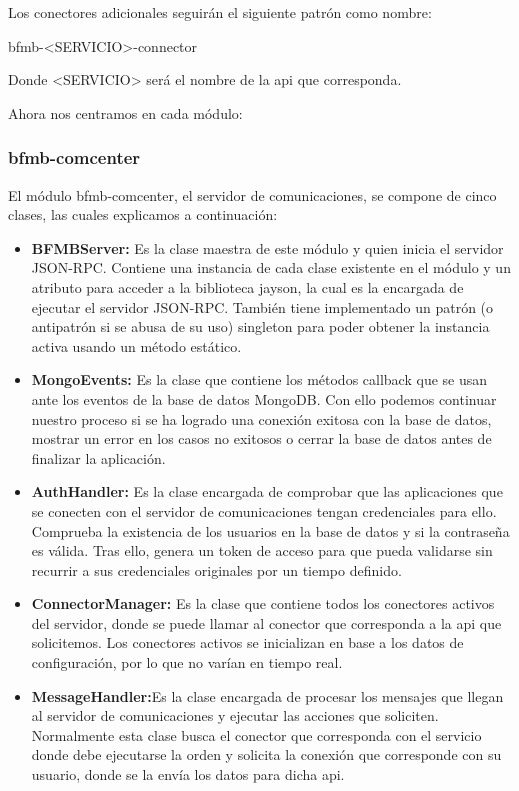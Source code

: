 \documentclass[spanish,12pt, a4paper, twoside]{paper}
\begin{document}
Los conectores adicionales seguirán el siguiente patrón como nombre:
\begin{center}bfmb-<SERVICIO>-connector\end{center}
Donde <SERVICIO> será el nombre de la api que corresponda.

Ahora nos centramos en cada módulo:

\subsubsection{bfmb-comcenter}

El módulo bfmb-comcenter, el servidor de comunicaciones, se compone de cinco clases, las cuales explicamos a continuación:

\begin{itemize}
\item\textbf{BFMBServer:} Es la clase maestra de este módulo y quien inicia el servidor JSON-RPC. Contiene una instancia de cada clase existente en el módulo y un atributo para acceder a la biblioteca jayson, la cual es la encargada de ejecutar el servidor JSON-RPC. También tiene implementado un patrón (o antipatrón si se abusa de su uso) singleton para poder obtener la instancia activa usando un método estático.
\item\textbf{MongoEvents:} Es la clase que contiene los métodos callback que se usan ante los eventos de la base de datos MongoDB. Con ello podemos continuar nuestro proceso si se ha logrado una conexión exitosa con la base de datos, mostrar un error en los casos no exitosos o cerrar la base de datos antes de finalizar la aplicación.
\item\textbf{AuthHandler:} Es la clase encargada de comprobar que las aplicaciones que se conecten con el servidor de comunicaciones tengan credenciales para ello. Comprueba la existencia de los usuarios en la base de datos y si la contraseña es válida. Tras ello, genera un token de acceso para que pueda validarse sin recurrir a sus credenciales originales por un tiempo definido.
\item\textbf{ConnectorManager:} Es la clase que contiene todos los conectores activos del servidor, donde se puede llamar al conector que corresponda a la api que solicitemos. Los conectores activos se inicializan en base a los datos de configuración, por lo que no varían en tiempo real.
\item\textbf{MessageHandler:}Es la clase encargada de procesar los mensajes que llegan al servidor de comunicaciones y ejecutar las acciones que soliciten. Normalmente esta clase busca el conector que corresponda con el servicio donde debe ejecutarse la orden y solicita la conexión que corresponde con su usuario, donde se la envía los datos para dicha api.
\end{itemize}
\end{document}
